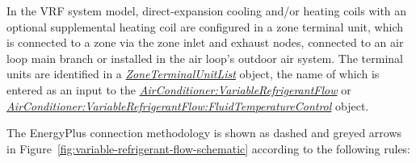 In the VRF system model, direct-expansion cooling and/or heating coils with an optional supplemental heating coil are configured in a zone terminal unit, which is connected to a zone via the zone inlet and exhaust nodes, connected to an air loop main branch or installed in the air loop's outdoor air system. The terminal units are identified in a \emph{\hyperref[zoneterminalunitlist]{ZoneTerminalUnitList}} object, the name of which is entered as an input to the \emph{\hyperref[airconditionervariablerefrigerantflow]{AirConditioner:VariableRefrigerantFlow}} or \emph{\hyperref[airconditionervariablerefrigerantflowfluidtemperaturecontrol]{AirConditioner:VariableRefrigerantFlow:FluidTemperatureControl}} object.

The EnergyPlus connection methodology is shown as dashed and greyed arrows in Figure~\ref{fig:variable-refrigerant-flow-schematic} according to the following rules:

